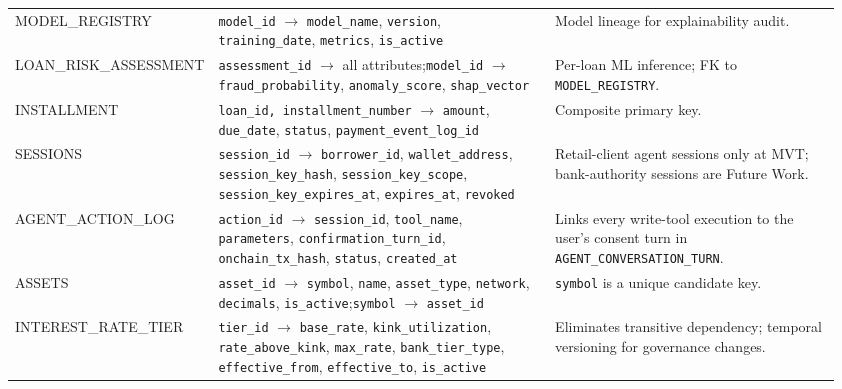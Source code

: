 \documentclass[12pt,a4paper]{report}
\begin{document}
\begin{table}[H]
\begin{tabular}{@{}%
  >{\raggedright\arraybackslash}p{0.17\linewidth}%
  >{\raggedright\arraybackslash}p{0.43\linewidth}%
  >{\raggedright\arraybackslash}p{0.36\linewidth}@{}}
MODEL\_REGISTRY & \texttt{model\_id} $\to$ \texttt{model\_name}, \texttt{version}, \texttt{training\_date}, \texttt{metrics}, \texttt{is\_active} & Model lineage for explainability audit. \\
LOAN\_RISK\_ASSESSMENT & \texttt{assessment\_id} $\to$ all attributes;\newline \texttt{model\_id} $\to$ \texttt{fraud\_probability}, \texttt{anomaly\_score}, \texttt{shap\_vector} & Per-loan ML inference; FK to \texttt{MODEL\_REGISTRY}. \\
INSTALLMENT & \texttt{loan\_id, installment\_number} $\to$ \texttt{amount}, \texttt{due\_date}, \texttt{status}, \texttt{payment\_event\_log\_id} & Composite primary key. \\
SESSIONS & \texttt{session\_id} $\to$ \texttt{borrower\_id}, \texttt{wallet\_address}, \texttt{session\_key\_hash}, \newline \texttt{session\_key\_scope}, \texttt{session\_key\_expires\_at}, \newline \texttt{expires\_at}, \texttt{revoked} & Retail-client agent sessions only at MVT; bank-authority sessions are Future Work. \\
AGENT\_ACTION\_LOG & \texttt{action\_id} $\to$ \texttt{session\_id}, \texttt{tool\_name}, \newline \texttt{parameters}, \texttt{confirmation\_turn\_id}, \newline \texttt{onchain\_tx\_hash}, \texttt{status}, \texttt{created\_at} & Links every write-tool execution to the user's consent turn in \texttt{AGENT\_CONVERSATION\_TURN}. \\
ASSETS & \texttt{asset\_id} $\to$ \texttt{symbol}, \texttt{name}, \texttt{asset\_type}, \newline \texttt{network}, \texttt{decimals}, \texttt{is\_active};\newline \texttt{symbol} $\to$ \texttt{asset\_id} & \texttt{symbol} is a unique candidate key. \\
INTEREST\_RATE\_TIER & \texttt{tier\_id} $\to$ \texttt{base\_rate}, \texttt{kink\_utilization}, \newline \texttt{rate\_above\_kink}, \texttt{max\_rate}, \texttt{bank\_tier\_type}, \texttt{effective\_from}, \texttt{effective\_to}, \texttt{is\_active} & Eliminates transitive dependency; temporal versioning for governance changes. \\
\bottomrule
\end{tabular}
\endgroup
\end{table}
\end{document}
